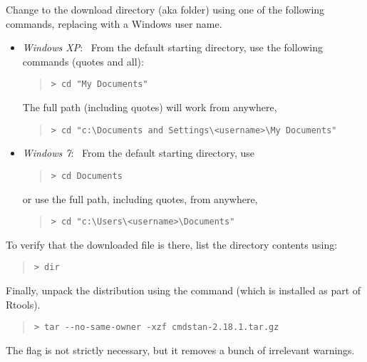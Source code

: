 Change to the download directory (aka folder) using one of the
following commands, replacing  with
a Windows user name.
%
\begin{itemize}
\item \emph{Windows XP}: \ From the default starting directory, use
the following commands (quotes and all):
\begin{quote}
\begin{Verbatim}[fontshape=sl,fontsize=\small]
> cd "My Documents"
\end{Verbatim}
\end{quote}
%
The full path (including quotes) will work from anywhere,
\begin{quote}
\begin{Verbatim}[fontshape=sl,fontsize=\small]
> cd "c:\Documents and Settings\<username>\My Documents"
\end{Verbatim}
\end{quote}
\item \emph{Windows 7}:  \  From the default starting directory, use
\begin{quote}
\begin{Verbatim}[fontshape=sl,fontsize=\small]
> cd Documents
\end{Verbatim}
\end{quote}
or use the full path, including quotes, from anywhere,
\begin{quote}
\begin{Verbatim}[fontshape=sl,fontsize=\small]
> cd "c:\Users\<username>\Documents"
\end{Verbatim}
\end{quote}
\end{itemize}
%
To verify that the downloaded \CmdStan {} file is there,
list the directory contents using:
%
\begin{quote}
\begin{Verbatim}[fontshape=sl,fontsize=\small]
> dir
\end{Verbatim}
\end{quote}

Finally, unpack the distribution using the  command (which
is installed as part of Rtools).
%
\begin{quote}
\begin{Verbatim}[fontshape=sl,fontsize=\small]
> tar --no-same-owner -xzf cmdstan-2.18.1.tar.gz
\end{Verbatim}
\end{quote}
%
The  flag is not strictly necessary,
but it removes a bunch of irrelevant warnings.


